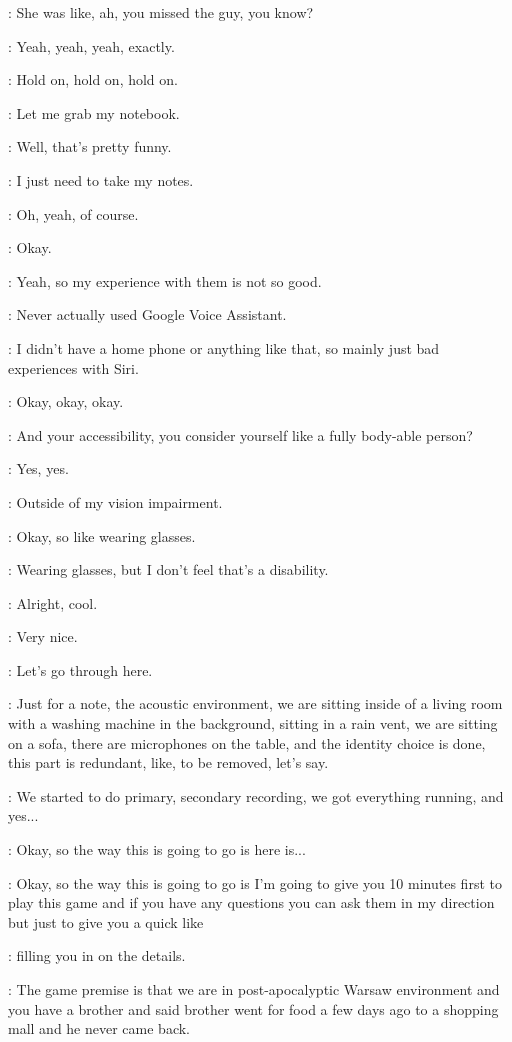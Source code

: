 \Gabriel: She was like, ah, you missed the guy, you know?

\Gabriel: Yeah, yeah, yeah, exactly.

\Kacper: Hold on, hold on, hold on.

\Kacper: Let me grab my notebook.

\Gabriel: Well, that's pretty funny.

\Gabriel: I just need to take my notes.

\Kacper: Oh, yeah, of course.

\Kacper: Okay.

\Kacper: Yeah, so my experience with them is not so good.

\Kacper: Never actually used Google Voice Assistant.

\Kacper: I didn't have a home phone or anything like that, so mainly just bad experiences with Siri.

\Kacper: Okay, okay, okay.

\Gabriel: And your accessibility, you consider yourself like a fully body-able person?

\Gabriel: Yes, yes.

\Gabriel: Outside of my vision impairment.

\Gabriel: Okay, so like wearing glasses.

\Gabriel: Wearing glasses, but I don't feel that's a disability.

\Gabriel: Alright, cool.

\Gabriel: Very nice.

\Gabriel: Let's go through here.

\Gabriel: Just for a note, the acoustic environment, we are sitting inside of a living room with a washing machine in the background, sitting in a rain vent, we are sitting on a sofa, there are microphones on the table, and the identity choice is done, this part is redundant, like, to be removed, let's say.

\Gabriel: We started to do primary, secondary recording, we got everything running, and yes...

\Gabriel: Okay, so the way this is going to go is here is...

\Gabriel: Okay, so the way this is going to go is I'm going to give you 10 minutes first to play this game and if you have any questions you can ask them in my direction but just to give you a quick like

\Gabriel: filling you in on the details.

\Gabriel: The game premise is that we are in post-apocalyptic Warsaw environment and you have a brother and said brother went for food a few days ago to a shopping mall and he never came back.

